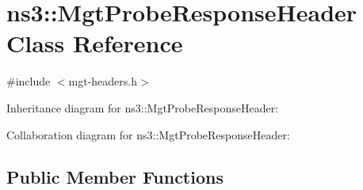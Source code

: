 \hypertarget{classns3_1_1MgtProbeResponseHeader}{}\section{ns3\+:\+:Mgt\+Probe\+Response\+Header Class Reference}
\label{classns3_1_1MgtProbeResponseHeader}


{\ttfamily \#include $<$mgt-\/headers.\+h$>$}



Inheritance diagram for ns3\+:\+:Mgt\+Probe\+Response\+Header\+:


Collaboration diagram for ns3\+:\+:Mgt\+Probe\+Response\+Header\+:
\subsection*{Public Member Functions}
